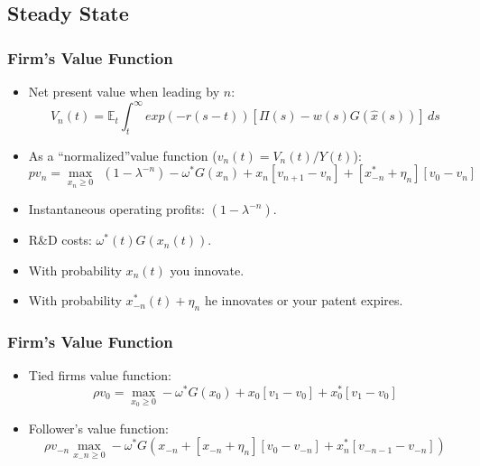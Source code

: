 \documentclass{beamer}
\begin{document}
\subsection{Steady State}
\label{sub:steady_state}
\begin{frame}[t]\frametitle{Firm's Value Function} 
  \begin{itemize}
    \item<+-> Net present value when leading by $n$:
      \begin{equation*}
        V_n(t) = \mathbb{E}_t \int_{t}^{\infty} exp(-r(s - t))[\Pi(s) - w(s)G(\hat{x}(s))]\,ds 
      \end{equation*}
    \item<+-> As a ``normalized''value function ($v_n(t) = V_n(t) / Y(t)$):
      \begin{equation*} \label{eq:rvf_leader}  %
          pv_n = \max_{x_n \geq 0}\ \ (1 - \lambda^{-n}) - \omega^*G(x_n) + x_n[v_{n+1} - v_n] + [x_{-n}^* + \eta_n][v_0 - v_n]
        \end{equation*}
    \item<+-> Instantaneous operating profits: $(1 - \lambda^{-n})$.
    \item<+-> R\&D costs: $\omega^*(t)G(x_n(t))$.
    \item<+-> With probability $x_n(t)$ you innovate.
    \item<+-> With probability $x_{-n}^*(t) + \eta_n$ he innovates or your patent expires.
  \end{itemize}
\end{frame}

\begin{frame}[t]\frametitle{Firm's Value Function} 
  \begin{itemize}
    \item<+-> Tied firms value function:
      \begin{equation*} \label{eq:rvf_tied}
        \rho v_0 = \max_{x_0 \geq 0} -\omega^*G(x_{0}) + x_{0}[v_1 - v_0] + x_0^*[v_{1} - v_0]
      \end{equation*}

    \item<+-> Follower's value function:
      \begin{equation*} \label{eq:rvf_follower}
        \rho v_{-n} \max_{x_-n \geq 0} -\omega^*G(x_{-n} + [x_{-n} + \eta_n][v_0 - v_{-n}] + x_n^*[v_{-n-1} - v_{-n}])
      \end{equation*}
  \end{itemize}
\end{frame}
\end{document}
